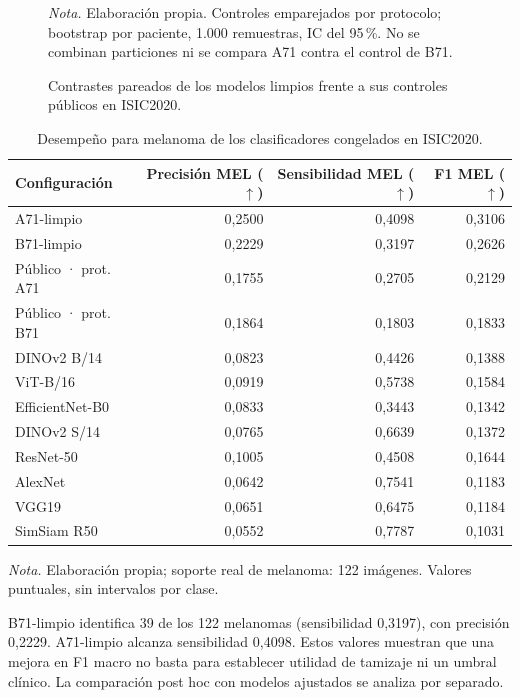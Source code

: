 \begin{figure}[!htbp]
\caption{Contrastes pareados de los modelos limpios frente a sus controles públicos en ISIC2020.}
\label{fig:contrastes-isic2020}
\centering

\par\smallskip
{\singlespacing\fontsize{11}{13}\selectfont\raggedright
\noindent\textit{Nota.} Elaboración propia. Controles emparejados por protocolo; bootstrap por paciente, 1.000 remuestras, IC del 95\,\%. No se combinan particiones ni se compara A71 contra el control de B71.\par}
\end{figure}
\FloatBarrier
\begin{table}[!htbp]
\centering
\caption{Desempeño para melanoma de los clasificadores congelados en ISIC2020.}
\label{tab:melanoma-isic2020}
\begingroup\fontsize{11}{13}\selectfont\singlespacing
\begin{tabularx}{\textwidth}{@{}Lrrr@{}}
\toprule
Configuración & Precisión MEL ($\uparrow$) & Sensibilidad MEL ($\uparrow$) & F1 MEL ($\uparrow$) \\
\midrule
A71-limpio & 0,2500 & 0,4098 & 0,3106 \\
B71-limpio & 0,2229 & 0,3197 & 0,2626 \\
Público · prot. A71 & 0,1755 & 0,2705 & 0,2129 \\
Público · prot. B71 & 0,1864 & 0,1803 & 0,1833 \\
DINOv2 B/14 & 0,0823 & 0,4426 & 0,1388 \\
ViT-B/16 & 0,0919 & 0,5738 & 0,1584 \\
EfficientNet-B0 & 0,0833 & 0,3443 & 0,1342 \\
DINOv2 S/14 & 0,0765 & 0,6639 & 0,1372 \\
ResNet-50 & 0,1005 & 0,4508 & 0,1644 \\
AlexNet & 0,0642 & 0,7541 & 0,1183 \\
VGG19 & 0,0651 & 0,6475 & 0,1184 \\
SimSiam R50 & 0,0552 & 0,7787 & 0,1031 \\
\bottomrule
\end{tabularx}
\par\smallskip\raggedright\textit{Nota.} Elaboración propia; soporte real de melanoma: 122 imágenes. Valores puntuales, sin intervalos por clase.\par\endgroup
\end{table}
B71-limpio identifica 39 de los 122 melanomas (sensibilidad 0,3197), con precisión 0,2229. A71-limpio alcanza sensibilidad 0,4098. Estos valores muestran que una mejora en F1 macro no basta para establecer utilidad de tamizaje ni un umbral clínico. La comparación post hoc con modelos ajustados se analiza por separado.



